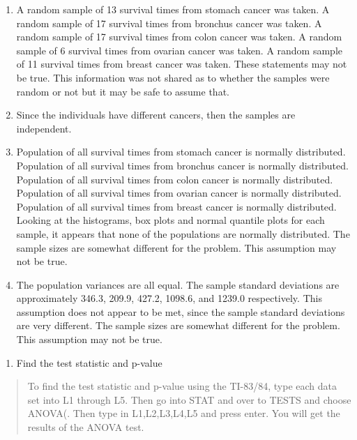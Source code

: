 \documentclass[]{book}
\providecommand{\tightlist}{%
  \setlength{\itemsep}{0pt}\setlength{\parskip}{0pt}}
\begin{document}
\begin{enumerate}
\def\labelenumi{\alph{enumi}.}
\item
  A random sample of 13 survival times from stomach cancer was taken. A random sample of 17 survival times from bronchus cancer was taken. A random sample of 17 survival times from colon cancer was taken. A random sample of 6 survival times from ovarian cancer was taken. A random sample of 11 survival times from breast cancer was taken. These statements may not be true. This information was not shared as to whether the samples were random or not but it may be safe to assume that.
\item
  Since the individuals have different cancers, then the samples are independent.
\item
  Population of all survival times from stomach cancer is normally distributed. Population of all survival times from bronchus cancer is normally distributed. Population of all survival times from colon cancer is normally distributed. Population of all survival times from ovarian cancer is normally distributed. Population of all survival times from breast cancer is normally distributed. Looking at the histograms, box plots and normal quantile plots for each sample, it appears that none of the populations are normally distributed. The sample sizes are somewhat different for the problem. This assumption may not be true.
\item
  The population variances are all equal. The sample standard deviations are approximately 346.3, 209.9, 427.2, 1098.6, and 1239.0 respectively. This assumption does not appear to be met, since the sample standard deviations are very different. The sample sizes are somewhat different for the problem. This assumption may not be true.
\end{enumerate}

\begin{enumerate}
\def\labelenumi{\arabic{enumi}.}
\setcounter{enumi}{3}
\tightlist
\item
  Find the test statistic and p-value
\end{enumerate}

\begin{quote}
To find the test statistic and p-value using the TI-83/84, type each data set into L1 through L5. Then go into STAT and over to TESTS and choose ANOVA(. Then type in L1,L2,L3,L4,L5 and press enter. You will get the results of the ANOVA test.
\end{quote}

\textbf{\\
}
\end{document}
